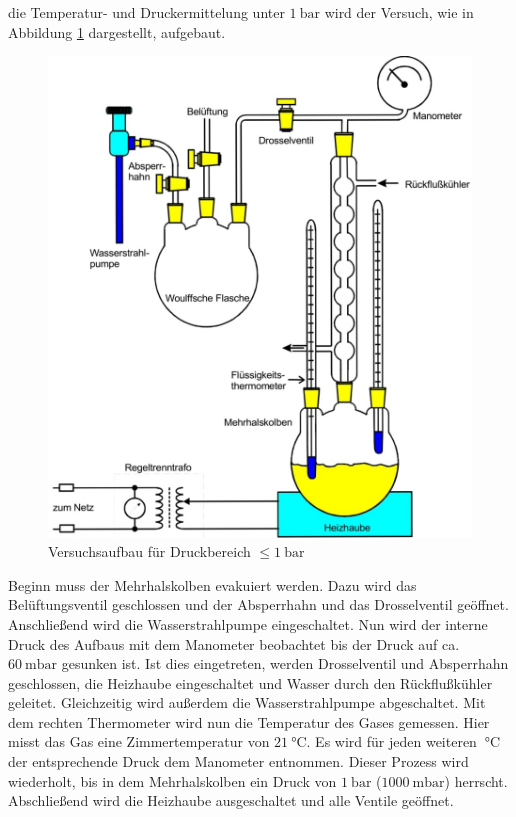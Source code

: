 \justifying die Temperatur- und Druckermittelung unter $\SI{1}{\bar}$ wird der Versuch, wie in Abbildung \ref{fig:2} dargestellt,
aufgebaut.

\begin{figure}
    \centering
    \includegraphics[width=0.75\linewidth]{./images/k1bar.jpg}
    \caption{Versuchsaufbau für Druckbereich $\leq \SI{1}{\bar}$ \cite{V203}}
    \label{fig:2}
\end{figure}
\newpage

\justifying Beginn muss der Mehrhalskolben evakuiert werden. Dazu wird das Belüftungsventil geschlossen und der Absperrhahn und
das Drosselventil geöffnet. Anschließend wird die Wasserstrahlpumpe eingeschaltet. Nun wird der interne Druck des Aufbaus mit dem Manometer
beobachtet bis der Druck auf ca. $\SI{60}{\milli\bar}$ gesunken ist. Ist dies eingetreten, werden Drosselventil und Absperrhahn geschlossen, die Heizhaube
eingeschaltet und Wasser durch den Rückflußkühler geleitet. Gleichzeitig wird außerdem die Wasserstrahlpumpe abgeschaltet. Mit dem rechten
Thermometer wird nun die Temperatur des Gases gemessen. Hier misst das Gas eine Zimmertemperatur von $\SI{21}{\celsius}$. Es wird für jeden 
weiteren $\SI{}{\celsius}$ der entsprechende Druck dem Manometer entnommen. Dieser Prozess wird wiederholt, bis in dem Mehrhalskolben ein Druck 
von $\SI{1}{\bar}$ ($\SI{1000}{\milli\bar}$) herrscht. Abschließend wird die Heizhaube ausgeschaltet und alle Ventile geöffnet.  

